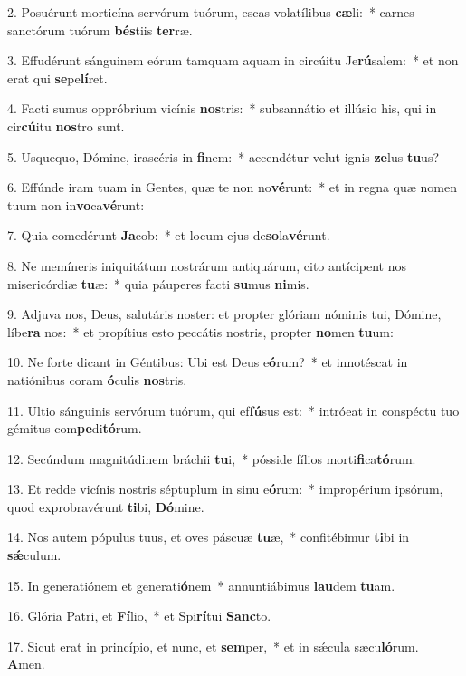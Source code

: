 2. Posuérunt morticína servórum tuórum, escas volatílibus \textbf{cæ}li:~*  carnes sanctórum tuórum \textbf{bés}tiis \textbf{ter}ræ.\

3. Effudérunt sánguinem eórum tamquam aquam in circúitu Je\textbf{rú}salem:~*  et non erat qui \textbf{se}pe\textbf{lí}ret.\

4. Facti sumus oppróbrium vicínis \textbf{nos}tris:~*  subsannátio et illúsio his, qui in cir\textbf{cú}itu \textbf{nos}tro sunt.\

5. Usquequo, Dómine, irascéris in \textbf{fi}nem:~*  accendétur velut ignis \textbf{ze}lus \textbf{tu}us?\

6. Effúnde iram tuam in Gentes, quæ te non no\textbf{vé}runt:~*  et in regna quæ nomen tuum non in\textbf{vo}ca\textbf{vé}runt:\

7. Quia comedérunt \textbf{Ja}cob:~*  et locum ejus de\textbf{so}la\textbf{vé}runt.\

8. Ne memíneris iniquitátum nostrárum antiquárum, cito antícipent nos misericórdiæ \textbf{tu}æ:~*  quia páuperes facti \textbf{su}mus \textbf{ni}mis.\

9. Adjuva nos, Deus, salutáris noster: et propter glóriam nóminis tui, Dómine, líbe\textbf{ra} nos:~*  et propítius esto peccátis nostris, propter \textbf{no}men \textbf{tu}um:\

10. Ne forte dicant in Géntibus: Ubi est Deus e\textbf{ó}rum?~*  et innotéscat in natiónibus coram \textbf{ó}culis \textbf{nos}tris.\

11. Ultio sánguinis servórum tuórum, qui ef\textbf{fú}sus est:~*  intróeat in conspéctu tuo gémitus com\textbf{pe}di\textbf{tó}rum.\

12. Secúndum magnitúdinem bráchii \textbf{tu}i,~*  pósside fílios morti\textbf{fi}ca\textbf{tó}rum.\

13. Et redde vicínis nostris séptuplum in sinu e\textbf{ó}rum:~*  impropérium ipsórum, quod exprobravérunt \textbf{ti}bi, \textbf{Dó}mine.\

14. Nos autem pópulus tuus, et oves páscuæ \textbf{tu}æ,~*  confitébimur \textbf{ti}bi in \textbf{sǽ}culum.\

15. In generatiónem et generati\textbf{ó}nem~*  annuntiábimus \textbf{lau}dem \textbf{tu}am.\

16. Glória Patri, et \textbf{Fí}lio,~*  et Spi\textbf{rí}tui \textbf{Sanc}to.\

17. Sicut erat in princípio, et nunc, et \textbf{sem}per,~*  et in sǽcula sæcu\textbf{ló}rum. \textbf{A}men.\

